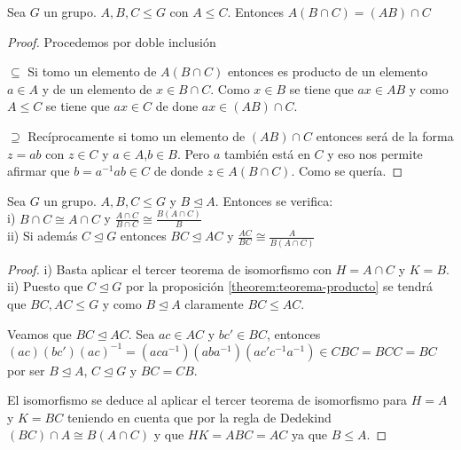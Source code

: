 \begin{lemma}
Sea $G$ un grupo. $A,B,C \le G$ con $A \le C$. Entonces $A(B \cap C) = (AB) \cap C$
\end{lemma}
\begin{proof}
Procedemos por doble inclusión

$\subseteq$ Si tomo un elemento de $A(B \cap C)$ entonces es producto de un elemento $a \in A$ y de un elemento de $x \in B \cap C$. Como $x \in B$ se tiene que $ax \in AB$ y como $A \le C$ se tiene que $ax \in C$ de done $ax \in (AB) \cap C$.

$\supseteq$ Recíprocamente si tomo un elemento de $(AB) \cap C$ entonces será de la forma $z = ab$ con $z \in C$ y $a \in A$,$b \in B$. Pero $a$ también está en $C$ y eso nos permite afirmar que $b = a^{-1}ab \in C$ de donde $z \in A(B \cap C)$. Como se quería.
\end{proof}

\begin{lemma}\label{lemma:consecuencia-tercer-teorema-isomorfia}
Sea $G$ un grupo. $A,B,C \le G$ y $B \trianglelefteq A$. Entonces se verifica:\\
i) $B \cap C \cong A \cap C$ y $\frac{A \cap C}{B \cap C} \cong \frac{B(A \cap C)}{B}$\\
ii) Si además $C \trianglelefteq G$ entonces $BC \trianglelefteq AC$ y $\frac{AC}{BC} \cong \frac{A}{B(A \cap C)}$
\end{lemma}
\begin{proof}
i) Basta aplicar el tercer teorema de isomorfismo con $H = A \cap C$ y $K = B$.\\
ii) Puesto que $C \trianglelefteq G$ por la proposición \ref{theorem:teorema-producto} se tendrá que $BC,AC \le G$ y como $B \trianglelefteq A$ claramente $BC \le AC$.

Veamos que $BC \trianglelefteq AC$. Sea $ac \in AC$ y $bc' \in BC$, entonces $(ac)(bc')(ac)^{-1} = (aca^{-1})(aba^{-1})(ac'c^{-1}a^{-1}) \in CBC = BCC = BC$ por ser $B \trianglelefteq A$, $C \trianglelefteq G$ y $BC =CB$.

El isomorfismo se deduce al aplicar el tercer teorema de isomorfismo para $H = A$ y $K = BC$ teniendo en cuenta que por la regla de Dedekind $(BC) \cap A \cong B(A \cap C)$ y que $HK = ABC = AC$ ya que $B \le A$.
\end{proof}

